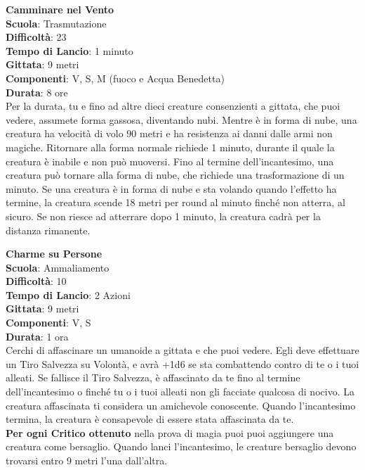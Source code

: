 \begin{multicols}{2}
\medskip\textbf{Camminare nel Vento}\\
\textbf{Scuola}: Trasmutazione\\
\textbf{Difficoltà}: 23\\
\textbf{Tempo di Lancio}: 1 minuto\\
\textbf{Gittata}: 9 metri\\
\textbf{Componenti}: V, S, M (fuoco e Acqua Benedetta)\\
\textbf{Durata}: 8 ore\\
Per la durata, tu e fino ad altre dieci creature consenzienti a gittata, che puoi vedere, assumete forma gassosa, diventando nubi. Mentre è in forma di nube, una creatura ha velocità di volo 90 metri e ha resistenza ai danni dalle armi non magiche. Ritornare alla forma normale richiede 1 minuto, durante il quale la creatura è inabile e non può muoversi. Fino al termine dell'incantesimo, una creatura può tornare alla forma di nube, che richiede una trasformazione di un minuto. Se una creatura è in forma di nube e sta volando quando l'effetto ha termine, la creatura scende 18 metri per round al minuto finché non atterra, al sicuro. Se non riesce ad atterrare dopo 1 minuto, la creatura cadrà per la distanza rimanente.

\medskip\textbf{Charme su Persone}\\
\textbf{Scuola}: Ammaliamento\\
\textbf{Difficoltà}: 10\\
\textbf{Tempo di Lancio}: 2 Azioni\\
\textbf{Gittata}: 9 metri\\
\textbf{Componenti}: V, S\\
\textbf{Durata}: 1 ora\\
Cerchi di affascinare un umanoide a gittata e che puoi vedere. Egli deve effettuare un Tiro Salvezza su Volontà, e avrà +1d6 se sta combattendo contro di te o i tuoi alleati. Se fallisce il Tiro Salvezza, è affascinato da te fino al termine dell'incantesimo o finché tu o i tuoi alleati non gli facciate qualcosa di nocivo. La creatura affascinata ti considera un amichevole conoscente. Quando l'incantesimo termina, la creatura è consapevole di essere stata affascinata da te. \\
\textbf{Per ogni Critico ottenuto} nella prova di magia puoi puoi aggiungere una creatura come bersaglio. Quando lanci l'incantesimo, le creature bersaglio devono trovarsi entro 9 metri l'una dall'altra.


\end{multicols}
